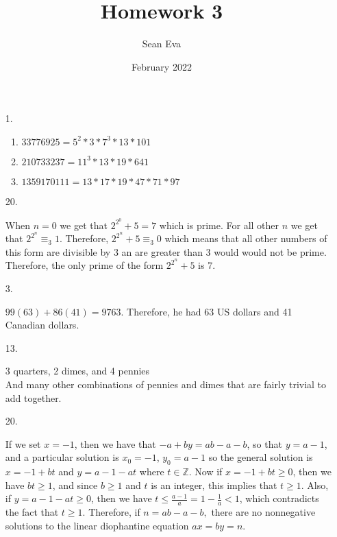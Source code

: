 \documentclass{article}
\title{Homework 3}
\author{Sean Eva}
\date{February 2022}
\theoremstyle{definition}
\newcommand{\Z}{\mathbb{Z}}
\begin{document}
\maketitle

\begin{enumerate}
    \item [1. ]
    
    \begin{enumerate}
        \item 
        
        $33776925 = 5^2*3*7^3*13*101$
        
        \item
        
        $210733237 = 11^3*13*19*641$
        
        \item
        
        $1359170111 = 13*17*19*47*71*97$
        
    \end{enumerate}
    
    \item [20. ]
    
    When $n=0$ we get that $2^{2^0} + 5 = 7$ which is prime. For all other $n$ we get that $2^{2^n} \equiv_3 1$. Therefore, $2^{2^n} + 5 \equiv_3 0$ which means that all other numbers of this form are divisible by 3 an are greater than 3 would would not be prime. Therefore, the only prime of the form $2^{2^n} + 5$ is 7.
    
    \item [3. ]
    
    $99(63)+86(41) = 9763$. Therefore, he had 63 US dollars and 41 Canadian dollars. 
    
    \item [13. ]
    
    3 quarters, 2 dimes, and 4 pennies\\
    And many other combinations of pennies and dimes that are fairly trivial to add together.
    
    \item [20. ]
    
    If we set $x = -1$, then we have that $-a + by = ab - a - b$, so that $y = a - 1$, and a particular solution is $x_0 = -1$, $y_0 = a - 1$ so the general solution is $x = -1 + bt$ and $y = a - 1 - at$ where $t\in \Z$. Now if $x = -1 + bt \geq 0$, then we have $bt \geq 1$, and since $b \geq 1$ and $t$ is an integer, this implies that $t \geq 1$. Also, if $y = a - 1 - at\geq 0$, then we have $t \leq \frac{a-1}{a} = 1 - \frac{1}{a} < 1$, which contradicts the fact that $t \geq 1$. Therefore, if $n = ab - a - b,$ there are no nonnegative solutions to the linear diophantine equation $ax = by = n.$
    

\end{enumerate}
\end{document}
